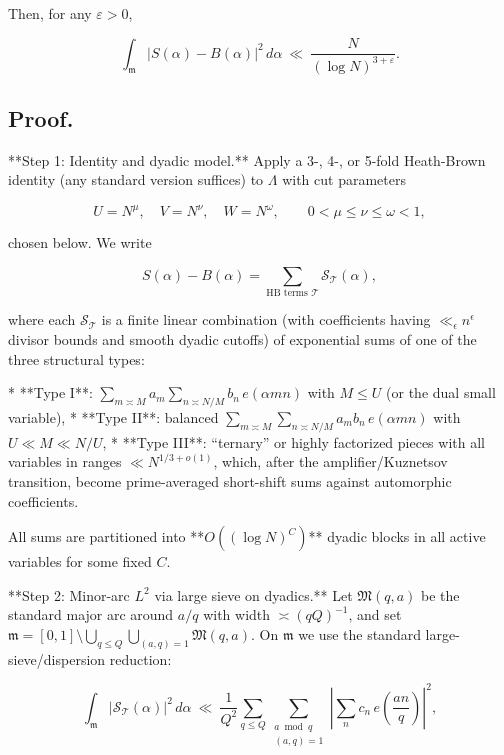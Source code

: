 \documentclass[11pt]{article}
\theoremstyle{definition}
\theoremstyle{remark}
\begin{document}
Then, for any $\varepsilon>0$,

$$
\int_{\mathfrak m}\big|S(\alpha)-B(\alpha)\big|^2\,d\alpha
\ \ll\ \frac{N}{(\log N)^{3+\varepsilon}}.
$$

\subsection*{Proof.}

**Step 1: Identity and dyadic model.**
Apply a 3-, 4-, or 5-fold Heath-Brown identity (any standard version suffices) to $\Lambda$ with cut parameters

$$
U=N^{\mu},\quad V=N^{\nu},\quad W=N^{\omega},\qquad 0<\mu\le\nu\le\omega<1,
$$

chosen below. We write

$$
S(\alpha)-B(\alpha)
=\sum_{\text{HB terms }\mathcal T} \mathcal S_{\mathcal T}(\alpha),
$$

where each $\mathcal S_{\mathcal T}$ is a finite linear combination (with coefficients having $\ll_\epsilon n^\epsilon$ divisor bounds and smooth dyadic cutoffs) of exponential sums of one of the three structural types:

* **Type I**: $\displaystyle \sum_{m\asymp M} a_m \sum_{n\asymp N/M} b_n\,e(\alpha mn)$ with $M\le U$ (or the dual small variable),
* **Type II**: balanced $\displaystyle \sum_{m\asymp M}\sum_{n\asymp N/M} a_m b_n\,e(\alpha mn)$ with $U\ll M\ll N/U$,
* **Type III**: “ternary” or highly factorized pieces with all variables in ranges $ \ll N^{1/3+o(1)}$, which, after the amplifier/Kuznetsov transition, become prime-averaged short-shift sums against automorphic coefficients.

All sums are partitioned into **$O((\log N)^C)$** dyadic blocks in all active variables for some fixed $C$.

**Step 2: Minor-arc $L^2$ via large sieve on dyadics.**
Let $\mathfrak M(q,a)$ be the standard major arc around $a/q$ with width $\asymp (qQ)^{-1}$, and set $\mathfrak m=[0,1]\setminus \bigcup_{q\le Q}\bigcup_{(a,q)=1}\mathfrak M(q,a)$. On $\mathfrak m$ we use the standard large-sieve/dispersion reduction:

\begin{equation}
\int_{\mathfrak m} \big|\mathcal S_{\mathcal T}(\alpha)\big|^2\,d\alpha
\ \ll\ \frac{1}{Q^2}\sum_{q\le Q}\sum_{\substack{a\bmod q\\(a,q)=1}}
\left|\sum_{n} c_n\,e\!\left(\frac{an}{q}\right)\right|^2,
\tag{D.3}
\end{equation}
\end{document}
